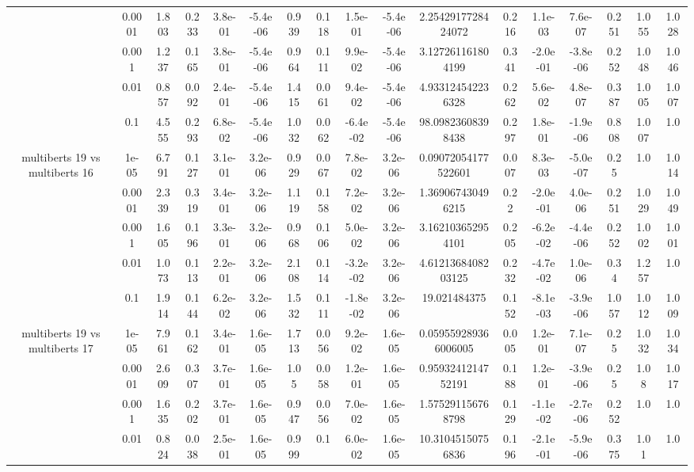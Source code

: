 \begin{tabular}{|c|c|c|c|c|c|c|c|c|c|c|c|c|c|c|c|c|}
 & 0.0001 & 1.803 & 0.233 & 3.8e-01 & -5.4e-06 & 0.939 & 0.118 & 1.5e-01 & -5.4e-06 & 2.2542917728424072 & 0.216 & 1.1e-03 & 7.6e-07 & 0.251 & 1.055 & 1.028 \\
 & 0.001 & 1.237 & 0.165 & 3.8e-01 & -5.4e-06 & 0.964 & 0.111 & 9.9e-02 & -5.4e-06 & 3.127261161804199 & 0.341 & -2.0e-01 & -3.8e-06 & 0.252 & 1.048 & 1.046 \\
 & 0.01 & 0.857 & 0.092 & 2.4e-01 & -5.4e-06 & 1.415 & 0.061 & 9.4e-02 & -5.4e-06 & 4.933124542236328 & 0.262 & 5.6e-02 & 4.8e-07 & 0.387 & 1.005 & 1.007 \\
 & 0.1 & 4.555 & 0.293 & 6.8e-02 & -5.4e-06 & 1.032 & 0.062 & -6.4e-02 & -5.4e-06 & 98.09823608398438 & 0.297 & 1.8e-01 & -1.9e-06 & 0.808 & 1.007 & 1.0 \\
\hline
\multirow{5}{*}{multiberts 19 vs multiberts 16} & 1e-05 & 6.791 & 0.127 & 3.1e-01 & 3.2e-06 & 0.929 & 0.067 & 7.8e-02 & 3.2e-06 & 0.09072054177522601 & 0.007 & 8.3e-03 & -5.0e-07 & 0.25 & 1.0 & 1.014 \\
 & 0.0001 & 2.339 & 0.319 & 3.4e-01 & 3.2e-06 & 1.119 & 0.158 & 7.2e-02 & 3.2e-06 & 1.369067430496215 & 0.22 & -2.0e-01 & 4.0e-06 & 0.251 & 1.029 & 1.049 \\
 & 0.001 & 1.605 & 0.196 & 3.3e-01 & 3.2e-06 & 0.968 & 0.106 & 5.0e-02 & 3.2e-06 & 3.162103652954101 & 0.205 & -6.2e-02 & -4.4e-06 & 0.252 & 1.002 & 1.001 \\
 & 0.01 & 1.073 & 0.113 & 2.2e-01 & 3.2e-06 & 2.108 & 0.114 & -3.2e-02 & 3.2e-06 & 4.6121368408203125 & 0.232 & -4.7e-02 & 1.0e-06 & 0.34 & 1.257 & 1.0 \\
 & 0.1 & 1.914 & 0.144 & 6.2e-02 & 3.2e-06 & 1.532 & 0.111 & -1.8e-02 & 3.2e-06 & 19.021484375 & 0.152 & -8.1e-03 & -3.9e-06 & 1.057 & 1.012 & 1.009 \\
\hline
\multirow{5}{*}{multiberts 19 vs multiberts 17} & 1e-05 & 7.961 & 0.162 & 3.4e-01 & 1.6e-05 & 1.713 & 0.056 & 9.2e-02 & 1.6e-05 & 0.059559289366006005 & 0.005 & 1.2e-01 & 7.1e-07 & 0.25 & 1.032 & 1.034 \\
 & 0.0001 & 2.609 & 0.307 & 3.7e-01 & 1.6e-05 & 1.05 & 0.058 & 1.2e-01 & 1.6e-05 & 0.9593241214752191 & 0.188 & 1.2e-01 & -3.9e-06 & 0.25 & 1.08 & 1.017 \\
 & 0.001 & 1.635 & 0.202 & 3.7e-01 & 1.6e-05 & 0.947 & 0.056 & 7.0e-02 & 1.6e-05 & 1.575291156768798 & 0.129 & -1.1e-02 & -2.7e-06 & 0.252 & 1.0 & 1.0 \\
 & 0.01 & 0.824 & 0.038 & 2.5e-01 & 1.6e-05 & 0.999 & 0.1 & 6.0e-02 & 1.6e-05 & 10.31045150756836 & 0.196 & -2.1e-01 & -5.9e-06 & 0.375 & 1.01 & 1.0 \\

\end{tabular}
